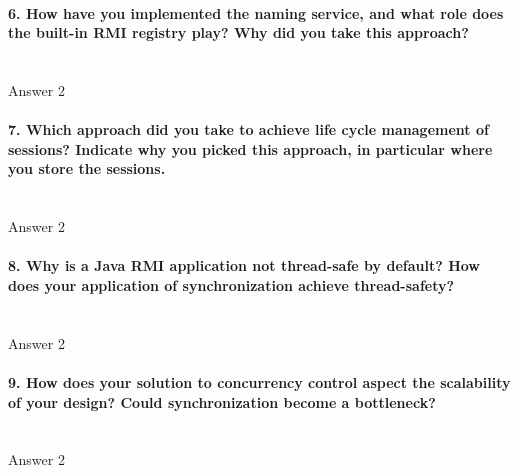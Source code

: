 \documentclass{ds-report}
\begin{document}
	\paragraph{6. How have you implemented the naming service, and what role does the built-in RMI registry play?
Why did you take this approach?} \mbox{}\\
	Answer 2

	\paragraph{7. Which approach did you take to achieve life cycle management of sessions? Indicate why you
picked this approach, in particular where you store the sessions.} \mbox{}\\
	Answer 2

	\paragraph{8. Why is a Java RMI application not thread-safe by default? How does your application of synchronization achieve thread-safety?} \mbox{}\\
	Answer 2

	\paragraph{9. How does your solution to concurrency control aspect the scalability of your design? Could
synchronization become a bottleneck?} \mbox{}\\
	Answer 2

	
	\clearpage
	
	
\end{document}

